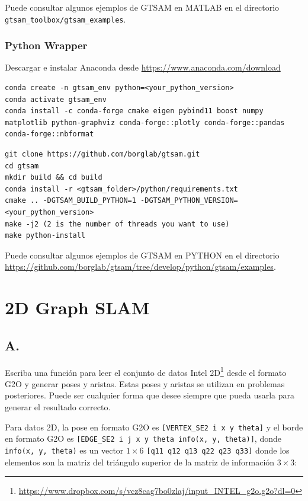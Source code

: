 \documentclass[tp]{lcc}
\begin{document}
Puede consultar algunos ejemplos de GTSAM en MATLAB en el directorio \lstinline[style=bash]{gtsam_toolbox/gtsam_examples}.

\subsubsection*{Python Wrapper}

Descargar e instalar Anaconda desde \url{https://www.anaconda.com/download}

\begin{lstlisting}[style=bash] 
conda create -n gtsam_env python=<your_python_version>
conda activate gtsam_env
conda install -c conda-forge cmake eigen pybind11 boost numpy matplotlib python-graphviz conda-forge::plotly conda-forge::pandas conda-forge::nbformat
\end{lstlisting}

\begin{lstlisting}[style=bash] 
git clone https://github.com/borglab/gtsam.git
cd gtsam
mkdir build && cd build
conda install -r <gtsam_folder>/python/requirements.txt
cmake .. -DGTSAM_BUILD_PYTHON=1 -DGTSAM_PYTHON_VERSION=<your_python_version>
make -j2 (2 is the number of threads you want to use)
make python-install
\end{lstlisting}

Puede consultar algunos ejemplos de GTSAM en PYTHON en el directorio \url{https://github.com/borglab/gtsam/tree/develop/python/gtsam/examples}.

\section{2D Graph SLAM}
\subsection{A.}
Escriba una función para leer el conjunto de datos Intel 2D\footnote{\url{https://www.dropbox.com/s/vcz8cag7bo0zlaj/input_INTEL_g2o.g2o?dl=0}} desde el formato G2O y generar poses y aristas. Estas poses y aristas se utilizan en problemas posteriores. Puede ser cualquier forma que desee siempre que pueda usarla para generar el resultado correcto.

Para datos 2D, la pose en formato G2O es \lstinline[style=bash]{[VERTEX_SE2 i x y theta]} y el borde en formato G2O es \lstinline[style=bash]{[EDGE_SE2 i j x y theta info(x, y, theta)]}, donde \lstinline[style=bash]{info(x, y, theta)} es un vector $1 \times 6$ \lstinline[style=bash]{[q11 q12 q13 q22 q23 q33]} donde los elementos son la matriz del triángulo superior de la matriz de información $3 \times 3$:
\end{document}
